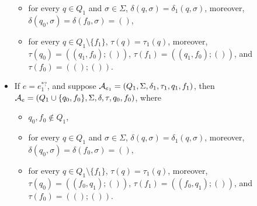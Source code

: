 \begin{itemize}
\begin{itemize}
    \item for every $q \in Q_1$ and $\sigma \in \Sigma$, $\delta(q, \sigma) = \delta_1(q, \sigma)$, moreover, $\delta(q_0, \sigma) = \delta(f_0, \sigma)  = ()$,
    
    \item for every $q \in Q_1 \setminus \{f_1\}$,  $\tau(q) = \tau_1(q)$, moreover, $\tau(q_0) = ((q_1, f_0); ())$, $\tau(f_1) = ((q_1, f_0); ())$, and $\tau(f_0) = ((); ())$.
  \end{itemize}
  \item If $e = e_1^{\ast?}$, and suppose $\mathcal{A}_{e_1} = (Q_1,
  \Sigma, \delta_1, \tau_1, q_1, f_1)$, then $\mathcal{A}_e = (Q_1 \cup \{q_0, f_0\}, \Sigma,
  \delta, \tau, q_0, f_0)$, where 
  \begin{itemize}
  \item $q_0, f_0 \not \in Q_1$,
  
    \item for every $q \in Q_1$ and $\sigma \in \Sigma$, $\delta(q, \sigma) = \delta_1(q, \sigma)$, moreover, $\delta(q_0, \sigma) = \delta(f_0, \sigma)  = ()$,
    
    \item for every $q \in Q_1 \setminus \{f_1\}$,  $\tau(q) = \tau_1(q)$, moreover, $\tau(q_0) = ((f_0, q_1); ())$, $\tau(f_1) = ((f_0, q_1); ())$, and $\tau(f_0) = ((); ())$.
  \end{itemize}  
\end{itemize}



